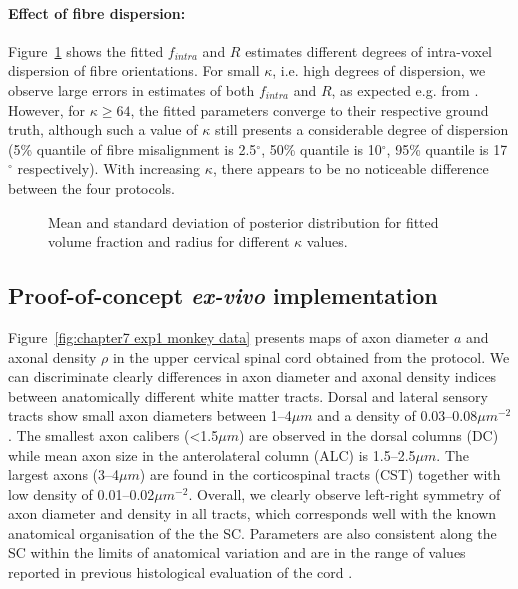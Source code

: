 \paragraph{Effect of fibre dispersion: } Figure~\ref{fig:chapter7 exp1 dispersion 60mT} shows the fitted $f_{intra}$ and $R$ estimates different degrees of intra-voxel dispersion of fibre orientations. For small $\kappa$, i.e. high degrees of dispersion, we observe large errors in estimates of both $f_{intra}$ and $R$, as expected e.g. from \citep{Zhang:2011}. However, for $\kappa \ge 64$, the fitted parameters converge to their respective ground truth, although such a value of $\kappa$ still presents a considerable degree of dispersion (5\% quantile of fibre misalignment is 2.5$^\circ$, 50\% quantile is 10$^\circ$, 95\% quantile is 17$^\circ$ respectively). With increasing $\kappa$, there appears to be no noticeable difference between the four protocols.

\begin{figure}[ht]
	\centering
	
	
	\caption{Mean and standard deviation of posterior distribution for fitted volume fraction and radius for different $\kappa$ values.}
	\label{fig:chapter7 exp1 dispersion 60mT}
\end{figure}

\subsection{Proof-of-concept \emph{ex-vivo} implementation}
Figure~\ref{fig:chapter7 exp1 monkey data} presents maps of axon diameter $a$ and axonal density $\rho$ in the upper cervical spinal cord obtained from the {\FD} protocol. We can discriminate clearly differences in axon diameter and axonal density indices between anatomically different white matter tracts. Dorsal and lateral sensory tracts show small axon diameters between 1--4$\mu m$ and a density of 0.03--0.08$\mu m^{-2}$. The smallest axon calibers (<1.5$\mu m$) are observed in the dorsal columns (DC) while mean axon size in the anterolateral column (ALC) is 1.5--2.5$\mu m$. The largest axons (3--4$\mu m$) are found in the corticospinal tracts (CST) together with low density of 0.01--0.02$\mu m^{-2}$. Overall, we clearly observe left-right symmetry of axon diameter and density in all tracts, which corresponds well with the known anatomical organisation of the the SC. Parameters are also consistent along the SC within the limits of anatomical variation and are in the range of values reported in previous histological evaluation of the cord \citep{GrafvonKeyserlingk:1984,Golabchi:2010}. 

